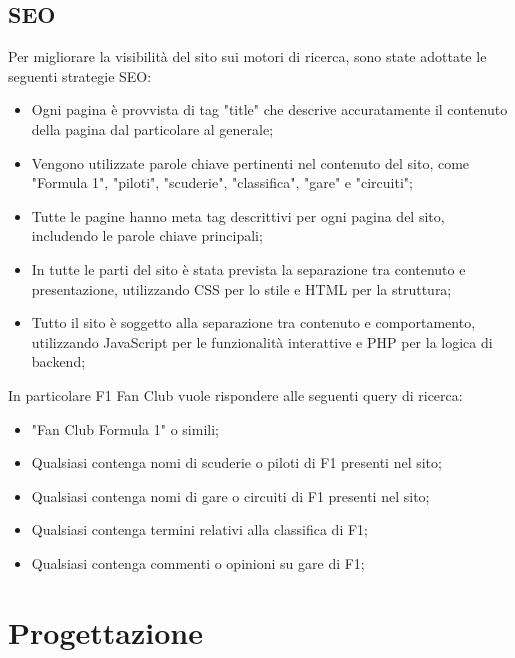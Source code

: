 \documentclass[11pt,a4paper]{article}
\begin{document}
\subsection{SEO}
Per migliorare la visibilità del sito sui motori di ricerca, sono state adottate le seguenti strategie SEO:
\begin{itemize}
    \item Ogni pagina è provvista di tag "title" che descrive accuratamente il contenuto della pagina dal particolare al generale;
    \item Vengono utilizzate parole chiave pertinenti nel contenuto del sito, come "Formula 1", "piloti", "scuderie", "classifica", "gare" e "circuiti";
    \item Tutte le pagine hanno meta tag descrittivi per ogni pagina del sito, includendo le parole chiave principali;
    \item In tutte le parti del sito è stata prevista la separazione tra contenuto e presentazione, utilizzando CSS per lo stile e HTML per la struttura;
    \item Tutto il sito è soggetto alla separazione tra contenuto e comportamento, utilizzando JavaScript per le funzionalità interattive e PHP per la logica di backend; 
\end{itemize}

In particolare F1 Fan Club vuole rispondere alle seguenti query di ricerca:
\begin{itemize}
    \item "Fan Club Formula 1" o simili;
    \item Qualsiasi contenga nomi di scuderie o piloti di F1 presenti nel sito;
    \item Qualsiasi contenga nomi di gare o circuiti di F1 presenti nel sito;
    \item Qualsiasi contenga termini relativi alla classifica di F1;
    \item Qualsiasi contenga commenti o opinioni su gare di F1;
\end{itemize}

\section{Progettazione}
\end{document}
